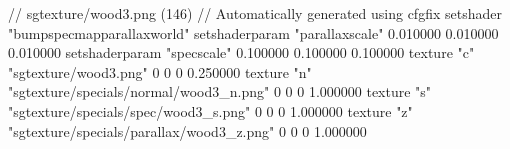 // sgtexture/wood3.png (146)
// Automatically generated using cfgfix
setshader "bumpspecmapparallaxworld"
setshaderparam "parallaxscale" 0.010000 0.010000 0.010000
setshaderparam "specscale" 0.100000 0.100000 0.100000
texture "c" "sgtexture/wood3.png" 0 0 0 0.250000
texture "n" "sgtexture/specials/normal/wood3_n.png" 0 0 0 1.000000
texture "s" "sgtexture/specials/spec/wood3_s.png" 0 0 0 1.000000
texture "z" "sgtexture/specials/parallax/wood3_z.png" 0 0 0 1.000000

